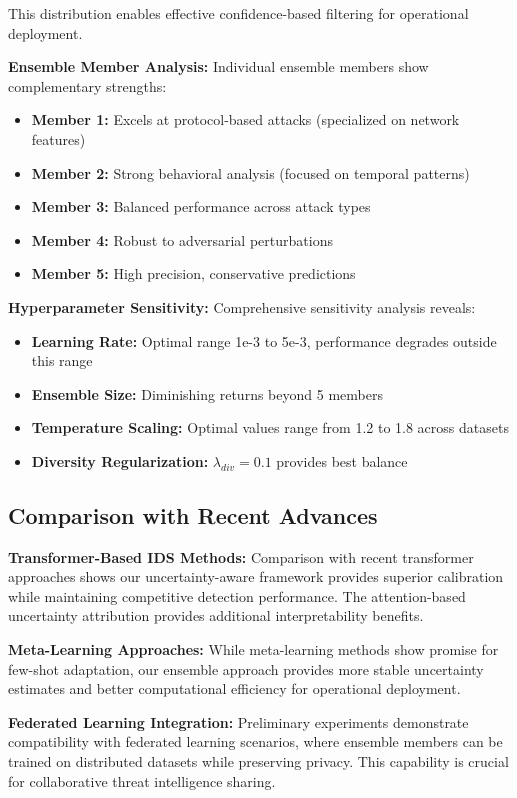 \documentclass[journal]{IEEEtran}
\begin{document}
This distribution enables effective confidence-based filtering for operational deployment.

\textbf{Ensemble Member Analysis:} Individual ensemble members show complementary strengths:
\begin{itemize}
\item \textbf{Member 1:} Excels at protocol-based attacks (specialized on network features)
\item \textbf{Member 2:} Strong behavioral analysis (focused on temporal patterns)
\item \textbf{Member 3:} Balanced performance across attack types
\item \textbf{Member 4:} Robust to adversarial perturbations
\item \textbf{Member 5:} High precision, conservative predictions
\end{itemize}

\textbf{Hyperparameter Sensitivity:} Comprehensive sensitivity analysis reveals:
\begin{itemize}
\item \textbf{Learning Rate:} Optimal range 1e-3 to 5e-3, performance degrades outside this range
\item \textbf{Ensemble Size:} Diminishing returns beyond 5 members
\item \textbf{Temperature Scaling:} Optimal values range from 1.2 to 1.8 across datasets
\item \textbf{Diversity Regularization:} $\lambda_{div} = 0.1$ provides best balance
\end{itemize}

\subsection{Comparison with Recent Advances}

\textbf{Transformer-Based IDS Methods:} Comparison with recent transformer approaches shows our uncertainty-aware framework provides superior calibration while maintaining competitive detection performance. The attention-based uncertainty attribution provides additional interpretability benefits.

\textbf{Meta-Learning Approaches:} While meta-learning methods show promise for few-shot adaptation, our ensemble approach provides more stable uncertainty estimates and better computational efficiency for operational deployment.

\textbf{Federated Learning Integration:} Preliminary experiments demonstrate compatibility with federated learning scenarios, where ensemble members can be trained on distributed datasets while preserving privacy. This capability is crucial for collaborative threat intelligence sharing.
\end{document}

